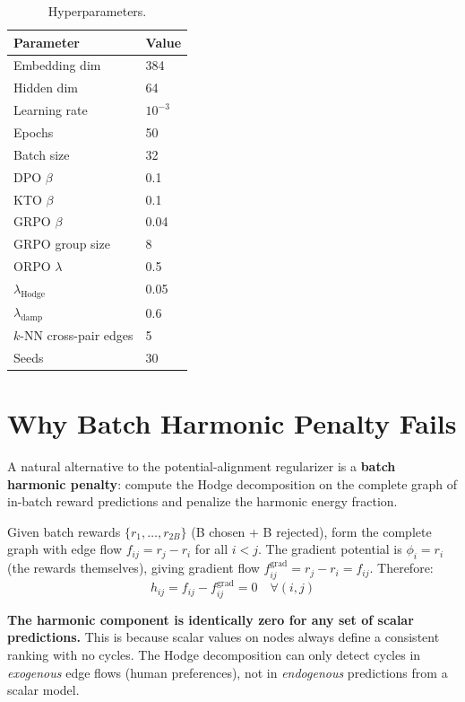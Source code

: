 \documentclass{article}
\begin{document}
\begin{table}[h]
\centering
\caption{Hyperparameters.}
\begin{tabular}{@{}ll@{}}
\toprule
\textbf{Parameter} & \textbf{Value} \\
\midrule
Embedding dim & 384 \\
Hidden dim & 64 \\
Learning rate & $10^{-3}$ \\
Epochs & 50 \\
Batch size & 32 \\
DPO $\beta$ & 0.1 \\
KTO $\beta$ & 0.1 \\
GRPO $\beta$ & 0.04 \\
GRPO group size & 8 \\
ORPO $\lambda$ & 0.5 \\
$\lambda_\text{Hodge}$ & 0.05 \\
$\lambda_\text{damp}$ & 0.6 \\
$k$-NN cross-pair edges & 5 \\
Seeds & 30 \\
\bottomrule
\end{tabular}
\end{table}

\section{Why Batch Harmonic Penalty Fails}
\label{app:batch_penalty}

A natural alternative to the potential-alignment regularizer is a \textbf{batch harmonic penalty}: compute the Hodge decomposition on the complete graph of in-batch reward predictions and penalize the harmonic energy fraction.

Given batch rewards $\{r_1, \dots, r_{2B}\}$ (B chosen + B rejected), form the complete graph with edge flow $f_{ij} = r_j - r_i$ for all $i < j$. The gradient potential is $\phi_i = r_i$ (the rewards themselves), giving gradient flow $f_{ij}^\text{grad} = r_j - r_i = f_{ij}$. Therefore:
\begin{equation}
    h_{ij} = f_{ij} - f_{ij}^\text{grad} = 0 \quad \forall (i,j)
\end{equation}

\textbf{The harmonic component is identically zero for any set of scalar predictions.} This is because scalar values on nodes always define a consistent ranking with no cycles. The Hodge decomposition can only detect cycles in \emph{exogenous} edge flows (human preferences), not in \emph{endogenous} predictions from a scalar model.
\end{document}
